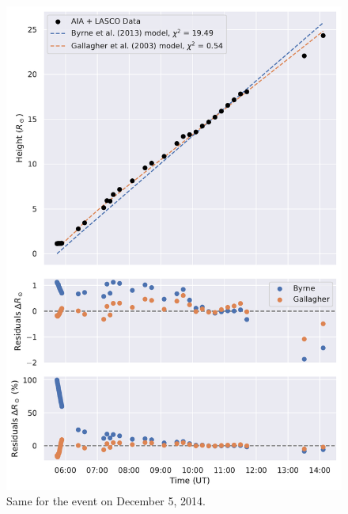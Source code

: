 \begin{figure}[!htp]
	\centering
	\includegraphics[width=0.8\hsize]{chapter2/figs/appendix/height_profile_residuals_aia_lasco_141205_01.pdf}
	\caption{Same for the event on December 5, 2014.}
\end{figure}

